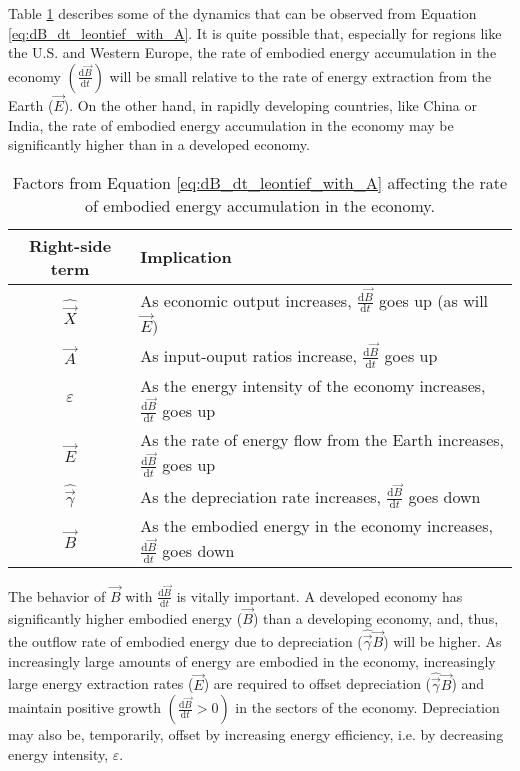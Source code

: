 Table \ref{table:embodied_energy_accumulation_factors} describes some of the dynamics that can be observed from Equation \ref{eq:dB_dt_leontief_with_A}. It is quite possible that, especially for regions like the U.S. and Western Europe, the rate of embodied energy accumulation in the economy $\left(\frac{\mathrm{d}\vec{B}}{\mathrm{d}t}\right)$ will be small relative to the rate of energy extraction from the Earth ($\vec{E}$). On the other hand, in rapidly developing countries, like China or India, the rate of embodied energy accumulation in the economy may be significantly higher than in a developed economy.



\begin{table}
\caption{Factors from Equation \ref{eq:dB_dt_leontief_with_A} affecting the rate of embodied energy accumulation in the economy.}
\begin{center}
  \begin{tabular}{| c | l | }
    \hline
    Right-side term & Implication \\ \hline
    $\hat{\vec{X}}$ & As economic output increases, $\frac{\mathrm{d}\vec{B}}{\mathrm{d}t}$ goes up (as will $\vec{E})$  \\ \hline
    $\vec{A}$ & As input-ouput ratios increase, $\frac{\mathrm{d}\vec{B}}{\mathrm{d}t}$ goes up  \\ \hline
    $\varepsilon$ & As the energy intensity of the economy increases, $\frac{\mathrm{d}\vec{B}}{\mathrm{d}t}$ goes up  \\ \hline
   $ \vec{E}$ & As the rate of energy flow from the Earth increases, $\frac{\mathrm{d}\vec{B}}{\mathrm{d}t}$ goes up  \\ \hline
    $\hat{\vec{\gamma}}$ & As the depreciation rate increases, $\frac{\mathrm{d}\vec{B}}{\mathrm{d}t}$ goes down  \\ \hline
    $\vec{B}$ & As the embodied energy in the economy increases, $\frac{\mathrm{d}\vec{B}}{\mathrm{d}t}$ goes down  \\ \hline
  \end{tabular}
\end{center}
\label{table:embodied_energy_accumulation_factors}
\end{table}


The behavior of $\vec{B}$ with $\frac{\mathrm{d}\vec{B}}{\mathrm{d}t}$ is vitally important. A developed economy has significantly higher embodied energy ($\vec{B}$) than a developing economy, and, thus, the outflow rate of embodied energy due to depreciation ($\hat{\vec{\gamma}}\vec{B}$) will be higher. As increasingly large amounts of energy are embodied in the economy, increasingly large energy extraction rates ($\vec{E}$) are required to offset depreciation ($\hat{\vec{\gamma}}\vec{B}$) and maintain positive growth $\left(\frac{\mathrm{d}\vec{B}}{\mathrm{d}t} > 0\right)$ in the sectors of the economy. Depreciation may also be, temporarily, offset by increasing energy efficiency, i.e. by decreasing energy intensity, $\varepsilon$.

